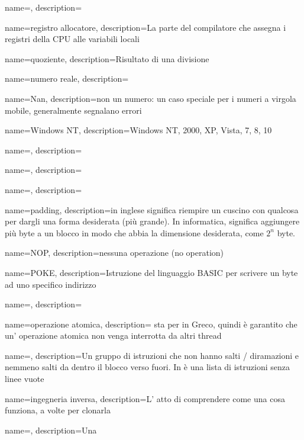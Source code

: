 {
  name={\ITph},
  description={\ITph{}}
}

{
  name={registro allocatore},
  description={La parte del compilatore che assegna i registri della CPU alle variabili locali}
}

{
  name={quoziente},
  description={Risultato di una divisione}
}

{
  name={numero reale},
  description={\ITph{}}
}

{
  name={Nan},
  description={non un numero:
	un caso speciale per i numeri a virgola mobile, generalmente segnalano errori}
}

{
  name={Windows NT},
  description={Windows NT, 2000, XP, Vista, 7, 8, 10}
}

{
  name={\ITph},
  description={\ITph{}}
}

{
  name={\ITph},
  description={\ITph{}}
}

{
  name={\ITph},
  description={\ITph{}}
}

{
  name={padding},
  description={in inglese significa riempire un cuscino con qualcosa per dargli una forma desiderata (più grande). In informatica, significa aggiungere più byte a un blocco in modo che abbia la dimensione desiderata, come $ 2 ^ n $ byte.}
}

{
  name={NOP},
  description={nessuna operazione (no operation)}
}

{
  name={POKE},
  description={Istruzione del linguaggio BASIC per scrivere un byte ad uno specifico indirizzo}
}

{
  name={\ITph},
  description={\ITph{}}
}

{
  name={operazione atomica},
  description={
  sta per  in Greco, quindi è garantito che un' operazione atomica non venga interrotta da altri thread}
}

{
  name={\ITph},
  description={Un gruppo di
	       istruzioni che non hanno salti / diramazioni e nemmeno salti da dentro il blocco verso fuori.
In \IDA è una lista di istruzioni senza linee vuote}
}

{
  name={ingegneria inversa},
  description={L' atto di comprendere come una cosa funziona, a volte per clonarla}
}

{
  name={\ITph},
  description={Una 	}
}
